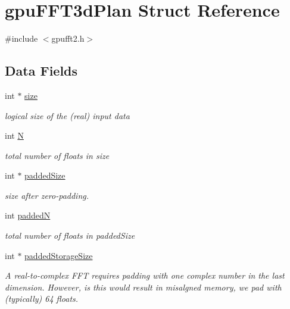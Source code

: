 \hypertarget{structgpuFFT3dPlan}{
\section{gpuFFT3dPlan Struct Reference}
\label{structgpuFFT3dPlan}
}


{\ttfamily \#include $<$gpufft2.h$>$}

\subsection*{Data Fields}
\begin{DoxyCompactItemize}
\item 
int $\ast$ \hyperlink{structgpuFFT3dPlan_acfb7f6674c6dec2f2e5d6defbe701f73}{size}
\begin{DoxyCompactList}\small\item\em logical size of the (real) input data \item\end{DoxyCompactList}\item 
int \hyperlink{structgpuFFT3dPlan_ab66a607bcdf3058d52d2ee6cb9c679d8}{N}
\begin{DoxyCompactList}\small\item\em total number of floats in size \item\end{DoxyCompactList}\item 
int $\ast$ \hyperlink{structgpuFFT3dPlan_a1699c93376061d98a1095da736918faa}{paddedSize}
\begin{DoxyCompactList}\small\item\em size after zero-\/padding. \item\end{DoxyCompactList}\item 
int \hyperlink{structgpuFFT3dPlan_a62288e1f5c4dc34b3141e811dbe209a6}{paddedN}
\begin{DoxyCompactList}\small\item\em total number of floats in paddedSize \item\end{DoxyCompactList}\item 
int $\ast$ \hyperlink{structgpuFFT3dPlan_aa894aac0e4982dc5f73d4041625b4708}{paddedStorageSize}
\begin{DoxyCompactList}\small\item\em A real-\/to-\/complex FFT requires padding with one complex number in the last dimension. However, is this would result in misalgned memory, we pad with (typically) 64 floats. \item\end{DoxyCompactList}\item 

\end{DoxyCompactItemize}
